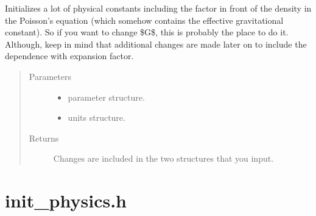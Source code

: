 \documentclass[letterpaper,10pt,english]{sphinxmanual}
\begin{document}
\begin{fulllineitems}
\label{\detokenize{sphinx-c-apidoc/output/init_physics_c:c.init_physics}}%
\pysigstartmultiline
{}%
\pysigstopmultiline
Initializes a lot of physical constants including the factor in front of
the density in the Poisson’s equation (which somehow contains the effective
gravitational constant).  So if you want to change \$G\$, this is probably
the place to do it.   Although, keep in mind that additional changes
are made later on to include the dependence with expansion factor.
\begin{quote}\begin{description}
\item[{Parameters}] \leavevmode\begin{itemize}
\item {} 
 \textendash{} parameter structure.

\item {} 
 \textendash{} units structure.

\end{itemize}

\item[{Returns}] \leavevmode
Changes are included in the two structures that you input.

\end{description}\end{quote}

\end{fulllineitems}



\section{init\_physics.h}
\label{\detokenize{sphinx-c-apidoc/output/init_physics_h:init-physics-h}}\label{\detokenize{sphinx-c-apidoc/output/init_physics_h::doc}}

\begin{fulllineitems}
\label{\detokenize{sphinx-c-apidoc/output/init_physics_h:c.init_physics}}%
\pysigstartmultiline
{}%
\pysigstopmultiline
\end{fulllineitems}
\end{document}
